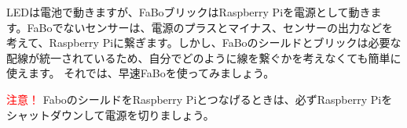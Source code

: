 LEDは電池で動きますが、FaBoブリックはRaspberry Piを電源として動きます。FaBoでないセンサーは、電源のプラスとマイナス、センサーの出力などを考えて、Raspberry Piに繋ぎます。しかし、FaBoのシールドとブリックは必要な配線が統一されているため、自分でどのように線を繋ぐかを考えなくても簡単に使えます。
それでは、早速FaBoを使ってみましょう。

\begin{itembox}[c]{\Large\textcolor{red}{注意！}}
  FaboのシールドをRaspberry Piとつなげるときは、必ずRaspberry Piをシャットダウンして電源を切りましょう。
\end{itembox}

